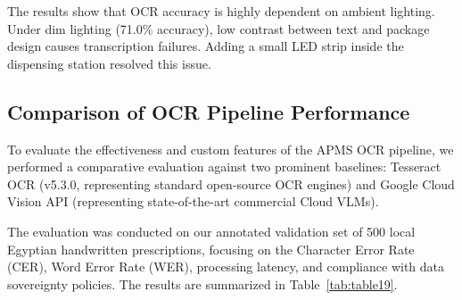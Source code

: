 \documentclass[12pt,a4paper,oneside]{report}
\begin{document}
The results show that OCR accuracy is highly dependent on ambient
lighting. Under dim lighting (71.0\% accuracy), low contrast between
text and package design causes transcription failures. Adding a small
LED strip inside the dispensing station resolved this issue.

\subsection{Comparison of OCR Pipeline
Performance}\label{comparison-of-ocr-pipeline-performance}

To evaluate the effectiveness and custom features of the APMS OCR
pipeline, we performed a comparative evaluation against two prominent
baselines: Tesseract OCR (v5.3.0, representing standard open-source OCR
engines) and Google Cloud Vision API (representing state-of-the-art
commercial Cloud VLMs).

The evaluation was conducted on our annotated validation set of 500
local Egyptian handwritten prescriptions, focusing on the Character
Error Rate (CER), Word Error Rate (WER), processing latency, and
compliance with data sovereignty policies. The results are summarized in
Table~\ref{tab:table19}.
\end{document}
